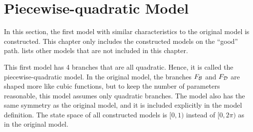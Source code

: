 \section{Piecewise-quadratic Model}
\label{sec:setup.quad}

In this section, the first model with similar characteristics to the original model is constructed.
This chapter only includes the constructed models on the ``good'' path.
 lists other models that are not included in this chapter.

This first model has 4 branches that are all quadratic.
Hence, it is called the piecewise-quadratic model.
In the original model, the branches $F_{\mathcal{B}}$ and $F_{\mathcal{D}}$ are shaped more like cubic functions, but to keep the number of parameters reasonable, this model assumes only quadratic branches.
The model also has the same symmetry as the original model, and it is included explicitly in the model definition.
The state space of all constructed models is $[0, 1)$ instead of $[0, 2\pi)$ as in the original model.




